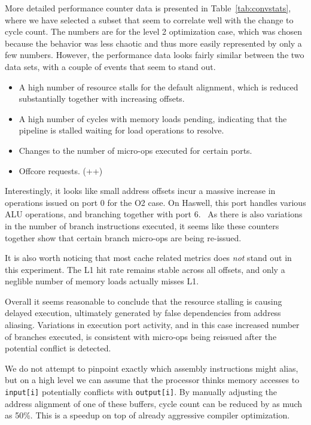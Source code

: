 \documentclass[prodmode,acmtaco]{acmsmall}
\begin{document}
{More detailed performance counter data is presented in Table~\ref{tab:convstats}, where we have selected a subset that seem to correlate well with the change to cycle count.
The numbers are for the level 2 optimization case, which was chosen because the behavior was less chaotic and thus more easily represented by only a few numbers.
However, the performance data looks fairly similar between the two data sets, with a couple of events that seem to stand out.
\begin{itemize}
    \item A high number of resource stalls for the default alignment, which is reduced substantially together with increasing offsets. 
    \item A high number of cycles with memory loads pending, indicating that the pipeline is stalled waiting for load operations to resolve.
    \item Changes to the number of micro-ops executed for certain ports.
    \item Offcore requests. (++) %
\end{itemize}
Interestingly, it looks like small address offsets incur a massive increase in operations issued on port 0 for the O2 case. 
On Haswell, this port handles various ALU operations, and branching together with port 6.~\cite[Figure 2.1]{OptimizationManual}
As there is also variations in the number of branch instructions executed, it seems like these counters together show that certain branch micro-ops are being re-issued.

It is also worth noticing that most cache related metrics does \emph{not} stand out in this experiment.
The L1 hit rate remains stable across all offsets, and only a neglible number of memory loads actually misses L1.

Overall it seems reasonable to conclude that the resource stalling is causing delayed execution, ultimately generated by false dependencies from address aliasing.
Variations in execution port activity, and in this case increased number of branches executed, is consistent with micro-ops being reissued after the potential conflict is detected.

We do not attempt to pinpoint exactly which assembly instructions might alias, but on a high level we can assume that the processor thinks memory accesses to \texttt{input[i]} potentially conflicts with \texttt{output[i]}.
By manually adjusting the address alignment of one of these buffers, cycle count can be reduced by as much as 50\%.
This is a speedup on top of already aggressive compiler optimization.

}
\end{document}
